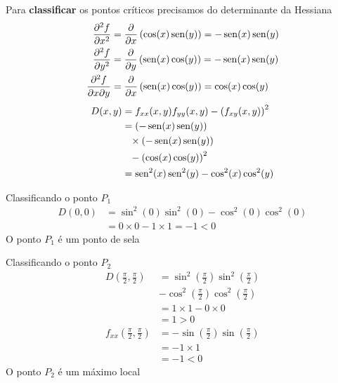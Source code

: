 \documentclass[a4paper,12pt,fleqn]{article}
\begin{document}
\begin{answer}
\begin{multicols}{2}
    \vspace{\baselineskip}
    Para \textbf{classificar} os pontos críticos precisamos
    do determinante da Hessiana
    \begin{align*}
      \frac{\partial^2 {f}}{\partial {x}^2}
      & = \frac{\partial {}}{\partial {x}}\left(\cos(x)\operatorname{sen}(y)\right)
        = -\operatorname{sen}(x)\operatorname{sen}(y) \\
      \frac{\partial^2 {f}}{\partial {y}^2}
      & = \frac{\partial {}}{\partial {y}}\left(\operatorname{sen}(x)\cos(y)\right)
        = -\operatorname{sen}(x)\operatorname{sen}(y) \\
      \frac{\partial^2 {f}}{\partial {x} \partial {y}}
      & = \frac{\partial {}}{\partial {x}}\left(\operatorname{sen}(x)\cos(y)\right)
        = \cos(x)\cos(y)
    \end{align*}
    \begin{align*}
      D(x, y)
      & = f_{xx}(x, y) f_{yy}(x, y) - \left(f_{xy}(x, y)\right)^2 \\
      & = \left(-\sin(x)\sin(y)\right) \\
      & \hpm \times
          \left(-\sin(x)\sin(y)\right) \\
      & \hpm - \left(\cos(x)\cos(y)\right)^2 \\
      & = \sin^2(x)\sin^2(y) - \cos^2(x)\cos^2(y)
    \end{align*}

    \vspace{\baselineskip}
    Classificando o ponto $P_1$
    \begin{align*}
      D\left(0, 0\right)
      & = \sin^2(0)\sin^2(0) - \cos^2(0)\cos^2(0) \\
      & = 0 \times 0 - 1 \times 1 = -1 < 0
    \end{align*}
    O ponto $P_1$ é um ponto de sela

    \vspace{\baselineskip}
    Classificando o ponto $P_2$
    \begin{align*}
      D\left(\frac{\pi}{2}, \frac{\pi}{2}\right)
      & = \sin^2\left(\frac{\pi}{2}\right)
          \sin^2\left(\frac{\pi}{2}\right) \\
      & - \cos^2\left(\frac{\pi}{2}\right)
          \cos^2\left(\frac{\pi}{2}\right) \\
      & = 1 \times 1 - 0 \times 0 \\
      &  = 1 > 0  \\
      f_{xx}\left(\frac{\pi}{2}, \frac{\pi}{2}\right)
      & = -\sin\left(\frac{\pi}{2}\right)
           \sin\left(\frac{\pi}{2}\right) \\
      & = -1\times 1 \\
      &  = -1 < 0
    \end{align*}
    O ponto $P_2$ é um máximo local


\end{multicols}
\end{answer}
\end{document}
